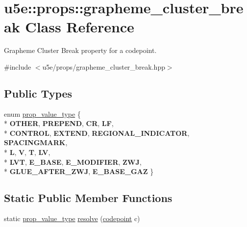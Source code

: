 \hypertarget{classu5e_1_1props_1_1grapheme__cluster__break}{}\section{u5e\+:\+:props\+:\+:grapheme\+\_\+cluster\+\_\+break Class Reference}
\label{classu5e_1_1props_1_1grapheme__cluster__break}


Grapheme Cluster Break property for a codepoint.  




{\ttfamily \#include $<$u5e/props/grapheme\+\_\+cluster\+\_\+break.\+hpp$>$}

\subsection*{Public Types}
\begin{DoxyCompactItemize}
\item 
enum \hyperlink{classu5e_1_1props_1_1grapheme__cluster__break_a49537cfb39f9510acd4096379687cf93}{prop\+\_\+value\+\_\+type} \{ \\*
{\bfseries O\+T\+H\+ER}, 
{\bfseries P\+R\+E\+P\+E\+ND}, 
{\bfseries CR}, 
{\bfseries LF}, 
\\*
{\bfseries C\+O\+N\+T\+R\+OL}, 
{\bfseries E\+X\+T\+E\+ND}, 
{\bfseries R\+E\+G\+I\+O\+N\+A\+L\+\_\+\+I\+N\+D\+I\+C\+A\+T\+OR}, 
{\bfseries S\+P\+A\+C\+I\+N\+G\+M\+A\+RK}, 
\\*
{\bfseries L}, 
{\bfseries V}, 
{\bfseries T}, 
{\bfseries LV}, 
\\*
{\bfseries L\+VT}, 
{\bfseries E\+\_\+\+B\+A\+SE}, 
{\bfseries E\+\_\+\+M\+O\+D\+I\+F\+I\+ER}, 
{\bfseries Z\+WJ}, 
\\*
{\bfseries G\+L\+U\+E\+\_\+\+A\+F\+T\+E\+R\+\_\+\+Z\+WJ}, 
{\bfseries E\+\_\+\+B\+A\+S\+E\+\_\+\+G\+AZ}
 \}
\end{DoxyCompactItemize}
\subsection*{Static Public Member Functions}
\begin{DoxyCompactItemize}
\item 
static \hyperlink{classu5e_1_1props_1_1grapheme__cluster__break_a49537cfb39f9510acd4096379687cf93}{prop\+\_\+value\+\_\+type} \hyperlink{classu5e_1_1props_1_1grapheme__cluster__break_a420baa4462ddbfa46c26a6205c79cd7b}{resolve} (\hyperlink{classu5e_1_1codepoint}{codepoint} c)
\end{DoxyCompactItemize}


